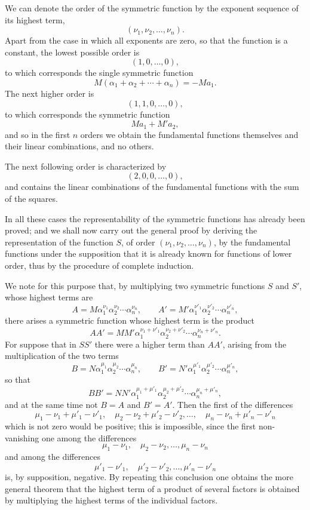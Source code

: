 \documentclass[11pt]{article}
\begin{document}
We can denote the order of the symmetric function by the exponent sequence of its highest term,
\[
 (\nu_1,\nu_2,\ldots,\nu_n).
\]
Apart from the case in which all exponents are zero, so that the function is a constant, the lowest possible order is
\[
 (1,0,\ldots,0),
\]
to which corresponds the single symmetric function
\[
 M(\alpha_1+\alpha_2+\cdots+\alpha_n)=-Ma_1.
\]
The next higher order is
\[
 (1,1,0,\ldots,0),
\]
to which corresponds the symmetric function
\[
 Ma_1+M'a_2,
\]
and so in the first \(n\) orders we obtain the fundamental functions themselves and their linear combinations, and no others.

The next following order is characterized by
\[
 (2,0,0,\ldots,0),
\]
and contains the linear combinations of the fundamental functions with the sum of the squares.

In all these cases the representability of the symmetric functions has already been proved; and we shall now carry out the general proof by deriving the representation of the function \(S\), of order \((\nu_1,\nu_2,\ldots,\nu_n)\), by the fundamental functions under the supposition that it is already known for functions of lower order, thus by the procedure of complete induction.

We note for this purpose that, by multiplying two symmetric functions \(S\) and \(S'\), whose highest terms are
\[
 A=M\alpha_1^{\nu_1}\alpha_2^{\nu_2}\cdots\alpha_n^{\nu_n},\qquad
 A'=M'\alpha_1^{\nu'_1}\alpha_2^{\nu'_2}\cdots\alpha_n^{\nu'_n},
\]
there arises a symmetric function whose highest term is the product
\[
 AA'=MM'\alpha_1^{\nu_1+\nu'_1}\alpha_2^{\nu_2+\nu'_2}\cdots\alpha_n^{\nu_n+\nu'_n}.
\]
For suppose that in \(SS'\) there were a higher term than \(AA'\), arising from the multiplication of the two terms
\[
 B=N\alpha_1^{\mu_1}\alpha_2^{\mu_2}\cdots\alpha_n^{\mu_n},\qquad
 B'=N'\alpha_1^{\mu'_1}\alpha_2^{\mu'_2}\cdots\alpha_n^{\mu'_n},
\]
so that
\[
 BB'=NN'\alpha_1^{\mu_1+\mu'_1}\alpha_2^{\mu_2+\mu'_2}\cdots\alpha_n^{\mu_n+\mu'_n},
\]
and at the same time not \(B=A\) and \(B'=A'\). Then the first of the differences
\[
 \mu_1-\nu_1+\mu'_1-\nu'_1,\quad
 \mu_2-\nu_2+\mu'_2-\nu'_2,\ldots,\quad
 \mu_n-\nu_n+\mu'_n-\nu'_n
\]
which is not zero would be positive; this is impossible, since the first non-vanishing one among the differences
\[
 \mu_1-\nu_1,\quad \mu_2-\nu_2,\ldots,\mu_n-\nu_n
\]
and among the differences
\[
 \mu'_1-\nu'_1,\quad \mu'_2-\nu'_2,\ldots,\mu'_n-\nu'_n
\]
is, by supposition, negative. By repeating this conclusion one obtains the more general theorem that the highest term of a product of several factors is obtained by multiplying the highest terms of the individual factors.
\end{document}
